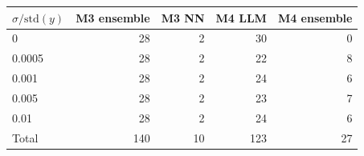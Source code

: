 \begin{tabular}{l r r r r}
\toprule
$\sigma/\mathrm{std}(y)$ & M3 ensemble & M3 NN & M4 LLM & M4 ensemble\\
\midrule
0 & 28 & 2 & 30 & 0\\
0.0005 & 28 & 2 & 22 & 8\\
0.001 & 28 & 2 & 24 & 6\\
0.005 & 28 & 2 & 23 & 7\\
0.01 & 28 & 2 & 24 & 6\\
\midrule
Total & 140 & 10 & 123 & 27\\
\bottomrule
\end{tabular}

